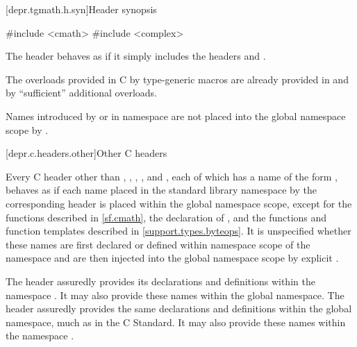 
[depr.tgmath.h.syn]{Header  synopsis}

%
\begin{codeblock}
#include <cmath>
#include <complex>
\end{codeblock}

\pnum
The header 
behaves as if it simply includes the headers
 and
.

\pnum
\begin{note}
The overloads provided in C by type-generic macros
are already provided in  and 
by ``sufficient'' additional overloads.
\end{note}

\pnum
\begin{note}
Names introduced by  or 
in namespace 
are not placed into the global namespace scope by .
\end{note}

[depr.c.headers.other]{Other C headers}

\pnum
Every C header
other than
,
,
,
, and
,
each of
which has a name of the form
%
,
behaves as if each name placed in the standard library namespace by
the corresponding
header is placed within
the global namespace scope,
except for the functions described in \ref{sf.cmath},
the declaration of , and
the functions and function templates described in \ref{support.types.byteops}.
It is unspecified whether these names are first declared or defined within
namespace scope of the namespace
 and are then injected into the global namespace scope by
explicit .

\pnum
\begin{example}
The header  assuredly
provides its declarations and definitions within the namespace
. It may also provide these names within the
global namespace.
The header 
assuredly provides the same declarations and definitions within
the global namespace,
much as in the C Standard. It may also provide these names within
the namespace .
\end{example}

